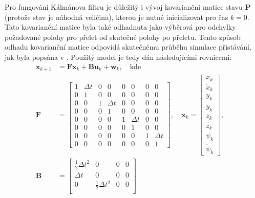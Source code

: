         Pro fungování Kálmánova filtru je důležitý i vývoj kovarianční matice stavu $\mathbf{P}$ (protože stav je náhodná veličina), kterou je nutné inicializovat pro čas $k=0$. Tato kovarianční matice byla také odhadnuta jako výběrová pro odchylky požadované polohy pro přelet od skutečné polohy po přeletu. Tento způsob odhadu kovarianční matice odpovídá skutečnému průběhu simulace přistávání, jak byla popsána v . Použitý model je tedy dán následujícími rovnicemi:
        \begin{align}
            \mathbf{x}_{k+1} &= \mathbf{Fx}_k + \mathbf{Bu}_k + \mathbf{w}_k,\quad\mathrm{kde} \label{eq:kalmanx} \\
            \mathbf{F} &= \begin{bmatrix}
                1 & \Delta t & 0 &        0 & 0 & 0        & 0 & 0 \\
                0 & 1        & 0 &        0 & 0 & 0        & 0 & 0 \\
                0 & 0        & 1 & \Delta t & 0 & 0        & 0 & 0 \\
                0 & 0        & 0 & 1        & 0 & 0        & 0 & 0 \\
                0 & 0        & 0 & 0        & 1 & \Delta t & 0 & 0 \\
                0 & 0        & 0 & 0        & 0 & 1        & 0 & 0 \\
                0 & 0        & 0 & 0        & 0 & 0        & 1 & \Delta t\\
                0 & 0        & 0 & 0        & 0 & 0        & 0 & 1
            \end{bmatrix}, \quad \mathbf{x}_k = \begin{bmatrix}
                x_k \\ \dot x_k \\ y_k \\ \dot y_k \\ z_k \\ \dot z_k \\ \psi_k \\ \dot\psi_k
            \end{bmatrix}, \quad \nonumber\\
            \mathbf{B} &= \begin{bmatrix}
                \frac{1}{2}\Delta t^2 & 0 & 0 & 0 \\
                \Delta t & 0 & 0 & 0 \\
                0 & \frac{1}{2}\Delta t^2 & 0 & 0 \\

\end{bmatrix}
\end{align}
